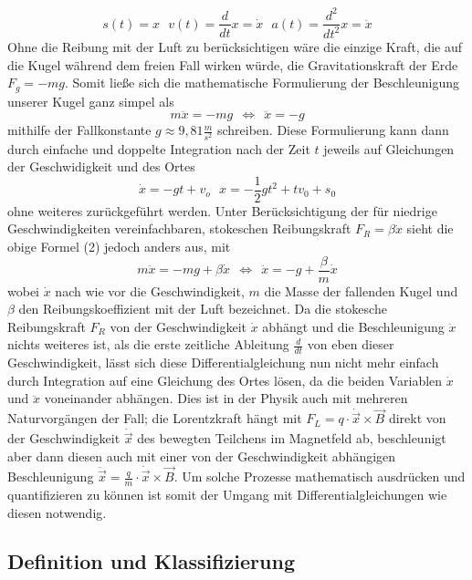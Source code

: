 \documentclass[a4paper,11pt]{article}
\theoremstyle{remark}
\begin{document}
\begin{equation}\label{eq1} s(t)=x \ \ \ v(t)=\frac{d}{dt}x=\dot{x} \ \ \ a(t)=\frac{d^2}{dt^2}x=\ddot{x} \end{equation} Ohne die Reibung mit der Luft zu berücksichtigen wäre die einzige Kraft, die auf die Kugel während dem freien Fall wirken würde, die Gravitationskraft der Erde $F_g=-mg$. Somit ließe sich die mathematische Formulierung der Beschleunigung unserer Kugel ganz simpel als 
\begin{equation}\label{eq2} m\ddot{x}=-mg \ \ \Leftrightarrow \ \ \ddot{x}=-g \end{equation} mithilfe der Fallkonstante $g\approx 9,81 \frac{m}{s^2}$ schreiben. Diese Formulierung kann dann durch einfache und doppelte Integration nach der Zeit $t$ jeweils auf Gleichungen der Geschwidigkeit und des Ortes 
\begin{equation}\label{eq3} \dot{x}=-gt+v_o \ \ \ x=-\frac{1}{2}gt^2+tv_0+s_0 \end{equation} ohne weiteres zurückgeführt werden. 
\newpage 
Unter Berücksichtigung der für niedrige Geschwindigkeiten vereinfachbaren, stokeschen Reibungskraft $F_{R}=\beta \dot{x}$ sieht die obige Formel (2) jedoch anders aus, mit \begin{equation}\label{eq4} m\ddot{x}=-mg+\beta \dot{x} \ \ \Leftrightarrow \ \ \ddot{x}=-g+\frac{\beta}{m}\dot{x} \end{equation} wobei $\dot{x}$ nach wie vor die Geschwindigkeit, $m$ die Masse der fallenden Kugel und $\beta$ den Reibungskoeffizient mit der Luft bezeichnet. Da die stokesche Reibungskraft $F_R$ von der Geschwindigkeit $\dot{x}$ abhängt und die Beschleunigung $\ddot{x}$ nichts weiteres ist, als die erste zeitliche Ableitung $\frac{d}{dt}$ von eben dieser Geschwindigkeit, lässt sich diese Differentialgleichung nun nicht mehr einfach durch Integration auf eine Gleichung des Ortes lösen, da die beiden Variablen $\dot{x}$ und $\ddot{x}$ voneinander abhängen. Dies ist in der Physik auch mit mehreren Naturvorgängen der Fall; die Lorentzkraft hängt mit $F_L=q \cdot \dot{\vec{x}} \times \vec{B}$ direkt von der Geschwindigkeit $\dot{\vec{x}}$ des bewegten Teilchens im Magnetfeld ab, beschleunigt aber dann diesen auch mit einer von der Geschwindigkeit abhängigen Beschleunigung $\ddot{\vec{x}}=\frac{q}{m} \cdot \dot{\vec{x}} \times \vec{B}$. Um solche Prozesse mathematisch ausdrücken und quantifizieren zu können ist somit der Umgang mit Differentialgleichungen wie diesen notwendig. 
\subsection{Definition und Klassifizierung}
\end{document}
